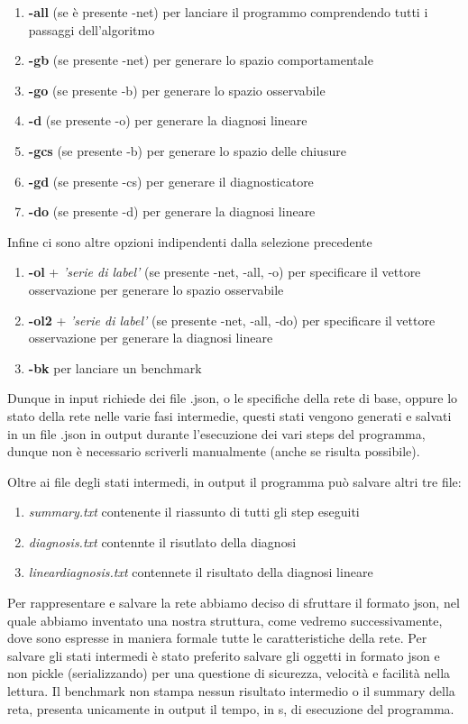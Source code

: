 \begin{enumerate}
    \item \textbf{-all} (se è presente -net) per lanciare il programmo comprendendo tutti i passaggi dell'algoritmo
    \item \textbf{-gb} (se presente -net) per generare lo spazio comportamentale
    \item \textbf{-go} (se presente -b) per generare lo spazio osservabile
    \item \textbf{-d} (se presente -o) per generare la diagnosi lineare
    \item \textbf{-gcs} (se presente -b) per generare lo spazio delle chiusure
    \item \textbf{-gd }(se presente -cs) per generare il diagnosticatore
    \item \textbf{-do} (se presente -d) per generare la diagnosi lineare
\end{enumerate}
Infine ci sono altre opzioni indipendenti dalla selezione precedente
\begin{enumerate}
    \item \textbf{-ol} + \textit{'serie di label'} (se presente -net, -all, -o) per specificare il vettore osservazione per generare lo spazio osservabile
    \item \textbf{-ol2 }+ \textit{'serie di label'} (se presente -net, -all, -do) per specificare il vettore osservazione per generare la diagnosi lineare
    \item \textbf{-bk} per lanciare un benchmark
\end{enumerate}
    
Dunque in input richiede dei file .json, o le specifiche della rete di base, oppure lo stato della rete nelle varie fasi intermedie, questi stati vengono generati e salvati in un file .json in output durante l'esecuzione dei vari steps del programma, dunque non è necessario scriverli manualmente (anche se risulta possibile).

Oltre ai file degli stati intermedi, in output il programma può salvare altri tre file:
\begin{enumerate}
    \item \textit{summary.txt} contenente il riassunto di tutti gli step eseguiti
    \item \textit{diagnosis.txt} contennte il risutlato della diagnosi
    \item \textit{lineardiagnosis.txt} contennete il risultato della diagnosi lineare
\end{enumerate}

Per rappresentare e salvare la rete abbiamo deciso di sfruttare il formato json, nel quale abbiamo inventato una nostra struttura, come vedremo successivamente, dove sono espresse in maniera formale tutte le caratteristiche della rete.
Per salvare gli stati intermedi è stato preferito salvare gli oggetti in formato json e non pickle (serializzando) per una questione di sicurezza, velocità e facilità nella lettura.
Il benchmark non stampa nessun risultato intermedio o il summary della reta, presenta unicamente in output il tempo, in s, di esecuzione del programma.

